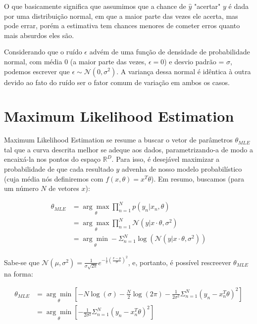 \documentclass{article}
\begin{document}
O que basicamente significa que assumimos que a chance de 
$\hat{y}$ "acertar" $y$ é dada por uma distribuição normal,
em que a maior parte das vezes ele acerta, mas pode errar,
porém a estimativa tem chances menores de cometer erros quanto
mais absurdos eles são.

Considerando que o ruído $\epsilon$
advém de uma função de densidade de probabilidade normal,
com média 0 (a maior parte das vezes, $\epsilon = 0$) e
desvio padrão = $\sigma$, podemos escrever que $\epsilon \sim
\mathcal{N}(0, \sigma^{2})$. A variança dessa normal é 
idêntica à outra devido ao fato do ruído ser o fator comum 
de variação em ambos os casos.

\section{Maximum Likelihood Estimation}

Maximum Likelihood Estimation se resume a buscar o vetor de 
parâmetros $\theta_{MLE}$ tal que a curva descrita melhor se 
adeque aos dados, parametrizando-a de modo a encaixá-la nos
pontos do espaço $\mathbb{R}^{D}$. Para isso, é desejável
maximizar a probabilidade de que cada resultado $y$ advenha
de nosso modelo probabilístico (cuja média nós definiremos
com $f(x,\theta) = x^{T}\theta$). Em resumo, buscamos
(para um número $N$ de vetores $x$):

\begin{align}
    \theta_{MLE} &= \underset{\theta}{\arg\max} 
    \prod_{n=1}^{N} p(y_{n}|x_{n}, \theta) \\
    &= \underset{\theta}{\arg\max} \prod_{n=1}^{N}
    \mathcal{N}(y|x \cdot \theta, \sigma^{2}) \\
    &= \underset{\theta}{\arg\min} 
    - \Sigma_{n=1}^{N} \log (\mathcal{N}
    (y|x \cdot \theta, \sigma^{2}))
\end{align}

Sabe-se que $\mathcal{N}(\mu, \sigma^{2}) = 
\frac{1}{\sigma \sqrt{2\pi}} e^{-\frac{1}{2}
(\frac{x - \mu}{\sigma})^{2}}$, e, portanto, é possível
rescreever $\theta_{MLE}$ na forma:

\begin{align}
    \theta_{MLE} &= \underset{\theta}{\arg\min}[ 
    -N\log(\sigma) -\frac{N}{2}\log(2\pi)
    -\frac{1}{2\sigma^{2}}\Sigma_{n=1}^{N}
    (y_{n} - x_{n}^{T}\theta)^{2}] \\
    &= \underset{\theta}{\arg\min} [
    -\frac{1}{2\sigma^{2}}\Sigma_{n=1}^{N}
    (y_{n} - x_{n}^{T}\theta)^{2}]
\end{align}
\end{document}

